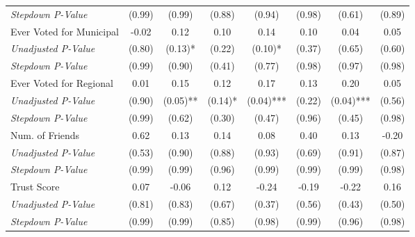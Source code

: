 \begin{tabular}{l c c c c c c c}
\quad \textit{Stepdown P-Value} & (0.99) & (0.99) & (0.88) & (0.94) & (0.98) & (0.61) & (0.89) \\
Ever Voted for Municipal & -0.02 & 0.12 & 0.10 & 0.14 & 0.10 & 0.04 & 0.05 \\
\quad \textit{Unadjusted P-Value} & (0.80) & (0.13)* & (0.22) & (0.10)* & (0.37) & (0.65) & (0.60) \\
\quad \textit{Stepdown P-Value} & (0.99) & (0.90) & (0.41) & (0.77) & (0.98) & (0.97) & (0.98) \\
Ever Voted for Regional & 0.01 & 0.15 & 0.12 & 0.17 & 0.13 & 0.20 & 0.05 \\
\quad \textit{Unadjusted P-Value} & (0.90) & (0.05)** & (0.14)* & (0.04)*** & (0.22) & (0.04)*** & (0.56) \\
\quad \textit{Stepdown P-Value} & (0.99) & (0.62) & (0.30) & (0.47) & (0.96) & (0.45) & (0.98) \\
Num. of Friends & 0.62 & 0.13 & 0.14 & 0.08 & 0.40 & 0.13 & -0.20 \\
\quad \textit{Unadjusted P-Value} & (0.53) & (0.90) & (0.88) & (0.93) & (0.69) & (0.91) & (0.87) \\
\quad \textit{Stepdown P-Value} & (0.99) & (0.99) & (0.96) & (0.99) & (0.99) & (0.99) & (0.98) \\
Trust Score & 0.07 & -0.06 & 0.12 & -0.24 & -0.19 & -0.22 & 0.16 \\
\quad \textit{Unadjusted P-Value} & (0.81) & (0.83) & (0.67) & (0.37) & (0.56) & (0.43) & (0.50) \\
\quad \textit{Stepdown P-Value} & (0.99) & (0.99) & (0.85) & (0.98) & (0.99) & (0.96) & (0.98) \\
\bottomrule
\end{tabular}

